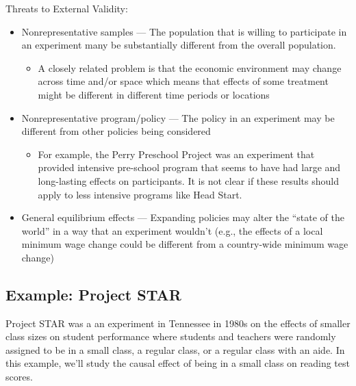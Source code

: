 \documentclass[
  letterpaper,
  DIV=11,
  numbers=noendperiod]{scrreprt}
\providecommand{\tightlist}{%
  \setlength{\itemsep}{0pt}\setlength{\parskip}{0pt}}\usepackage{longtable,booktabs,array}
\begin{document}
Threats to External Validity:

\begin{itemize}
\item
  Nonrepresentative samples --- The population that is willing to
  participate in an experiment many be substantially different from the
  overall population.

  \begin{itemize}
  \tightlist
  \item
    A closely related problem is that the economic environment may
    change across time and/or space which means that effects of some
    treatment might be different in different time periods or locations
  \end{itemize}
\item
  Nonrepresentative program/policy --- The policy in an experiment may
  be different from other policies being considered

  \begin{itemize}
  \tightlist
  \item
    For example, the Perry Preschool Project was an experiment that
    provided intensive pre-school program that seems to have had large
    and long-lasting effects on participants. It is not clear if these
    results should apply to less intensive programs like Head Start.
  \end{itemize}
\item
  General equilibrium effects --- Expanding policies may alter the
  ``state of the world'' in a way that an experiment wouldn't (e.g., the
  effects of a local minimum wage change could be different from a
  country-wide minimum wage change)
\end{itemize}

\subsection{Example: Project STAR}\label{example-project-star}

Project STAR was a an experiment in Tennessee in 1980s on the effects of
smaller class sizes on student performance where students and teachers
were randomly assigned to be in a small class, a regular class, or a
regular class with an aide. In this example, we'll study the causal
effect of being in a small class on reading test scores.
\end{document}
